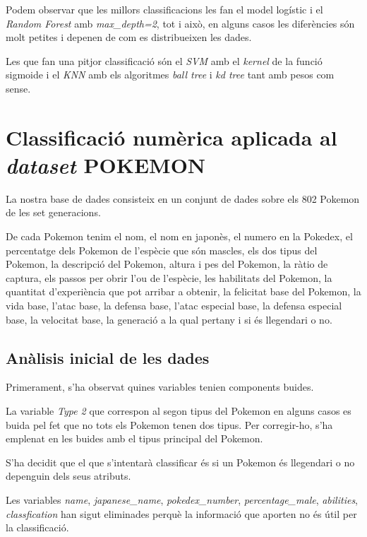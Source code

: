 \documentclass[a4paper, 11pt]{article}
\begin{document}
        Podem observar que les millors classificacions les fan el model logístic i el \textit{Random Forest}
        amb \textit{max\_depth=2}, tot i això, en alguns casos les diferències són molt petites i
        depenen de com es distribueixen les dades.

        Les que fan una pitjor classificació són el \textit{SVM} amb el \textit{kernel} de la funció sigmoide
        i el \textit{KNN} amb els algoritmes \textit{ball tree} i \textit{kd tree} tant amb pesos com sense.

    \newpage
    \section{Classificació numèrica aplicada al \textit{dataset} POKEMON}
    La nostra base de dades consisteix en un conjunt de dades sobre els 802 Pokemon de les set
    generacions.

    De cada Pokemon tenim el nom, el nom en japonès, el numero en la Pokedex, el percentatge dels
    Pokemon de l'espècie que són mascles, els dos tipus del Pokemon, la descripció del Pokemon,
    altura i pes del Pokemon, la ràtio de captura, els passos per obrir l'ou de l'espècie, les
    habilitats del Pokemon, la quantitat d'experiència que pot arribar a obtenir, la felicitat base
    del Pokemon, la vida base, l'atac base, la defensa base, l'atac especial base, la defensa
    especial base, la velocitat base, la generació a la qual pertany i si és llegendari o no.

    \subsection{Anàlisis inicial de les dades}
    Primerament, s'ha observat quines variables tenien components buides.

    La variable \textit{Type 2} que correspon al segon tipus del Pokemon en alguns casos es
    buida pel fet que no tots els Pokemon tenen dos tipus. Per corregir-ho, s'ha emplenat en les
    buides amb el tipus principal del Pokemon.

    S'ha decidit que el que s'intentarà classificar és si un Pokemon és llegendari o no depenguin dels seus atributs.

    Les variables \textit{name}, \textit{japanese\_name}, \textit{pokedex\_number},
    \textit{percentage\_male}, \textit{abilities}, \textit{classfication}
    han sigut eliminades perquè la informació que aporten no és útil per la classificació.
\end{document}
